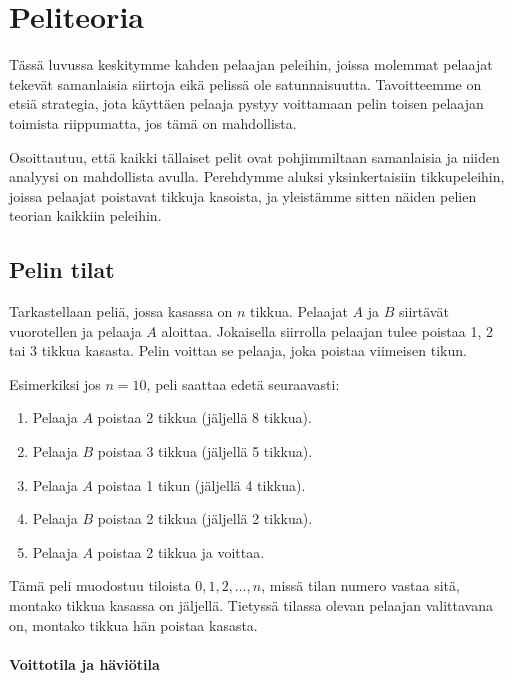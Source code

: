 \chapter{Peliteoria}

Tässä luvussa keskitymme kahden pelaajan peleihin,
joissa molemmat pelaajat tekevät
samanlaisia siirtoja eikä pelissä ole satunnaisuutta.
Tavoitteemme on etsiä strategia, jota käyttäen
pelaaja pystyy voittamaan pelin toisen pelaajan
toimista riippumatta, jos tämä on mahdollista.

Osoittautuu, että kaikki tällaiset pelit ovat
pohjimmiltaan samanlaisia ja niiden analyysi on
mahdollista  avulla.
Perehdymme aluksi yksinkertaisiin tikkupeleihin,
joissa pelaajat poistavat tikkuja kasoista,
ja yleistämme sitten näiden pelien teorian kaikkiin peleihin.

\section{Pelin tilat}

Tarkastellaan peliä, jossa kasassa on $n$ tikkua.
Pelaajat $A$ ja $B$ siirtävät vuorotellen ja
pelaaja $A$ aloittaa.
Jokaisella siirrolla pelaajan tulee poistaa
1, 2 tai 3 tikkua kasasta.
Pelin voittaa se pelaaja, joka poistaa viimeisen tikun.

Esimerkiksi jos $n=10$, peli saattaa edetä seuraavasti:
\begin{enumerate}[noitemsep]
\item Pelaaja $A$ poistaa 2 tikkua (jäljellä 8 tikkua).
\item Pelaaja $B$ poistaa 3 tikkua (jäljellä 5 tikkua).
\item Pelaaja $A$ poistaa 1 tikun (jäljellä 4 tikkua).
\item Pelaaja $B$ poistaa 2 tikkua (jäljellä 2 tikkua).
\item Pelaaja $A$ poistaa 2 tikkua ja voittaa.
\end{enumerate}
Tämä peli muodostuu tiloista $0,1,2,\ldots,n$,
missä tilan numero vastaa sitä, montako tikkua
kasassa on jäljellä.
Tietyssä tilassa olevan pelaajan valittavana on,
montako tikkua hän poistaa kasasta.

\subsubsection{Voittotila ja häviötila}



